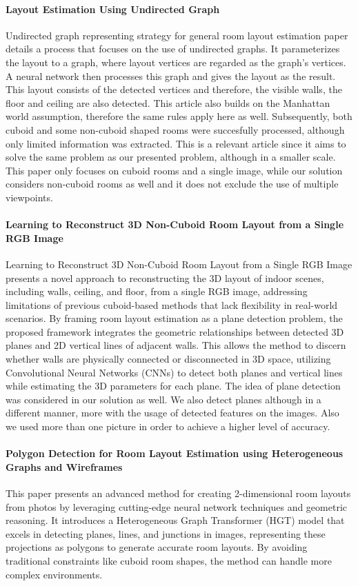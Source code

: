\paragraph{Layout Estimation Using Undirected Graph}
Undirected graph representing strategy for general room layout estimation\cite{YAO2023103963}
paper details a process that focuses on the use of undirected graphs. It parameterizes the layout to a graph, where layout vertices are regarded as the graph's vertices. A neural network then processes this graph and gives the layout as the result. This layout consists of the detected vertices and therefore, the visible walls, the floor and ceiling are also detected. This article also builds on the Manhattan world assumption\cite{790349}, therefore the same rules apply here as well. Subsequently, both cuboid and some non-cuboid shaped rooms were succesfully processed, although only limited information was extracted. This is a relevant article since it aims to solve the same problem as our presented problem, although in a smaller scale. This paper only focuses on cuboid rooms and a single image, while our solution considers non-cuboid rooms as well and it does not exclude the use of multiple viewpoints. 

\paragraph{Learning to Reconstruct 3D Non-Cuboid Room Layout from a Single RGB Image}
Learning to Reconstruct 3D Non-Cuboid Room Layout from a Single RGB Image\cite{9707088} presents a novel approach to reconstructing the 3D layout of indoor scenes, including walls, ceiling, and floor, from a single RGB image, addressing limitations of previous cuboid-based methods that lack flexibility in real-world scenarios. By framing room layout estimation as a plane detection problem, the proposed framework integrates the geometric relationships between detected 3D planes and 2D vertical lines of adjacent walls. This allows the method to discern whether walls are physically connected or disconnected in 3D space, utilizing Convolutional Neural Networks (CNNs) to detect both planes and vertical lines while estimating the 3D parameters for each plane. The idea of plane detection was considered in our solution as well. We also detect planes although in a different manner, more with the usage of detected features on the images. Also we used more than one picture in order to achieve a higher level of accuracy.

\paragraph{Polygon Detection for Room Layout Estimation using Heterogeneous Graphs and Wireframes}
This paper \cite{10350607} presents an advanced method for creating 2-dimensional room layouts from photos by leveraging cutting-edge neural network techniques and geometric reasoning. 
It introduces a Heterogeneous Graph Transformer (HGT) model that excels in detecting planes, lines, and junctions in images, representing these projections as polygons to generate accurate room layouts. 
By avoiding traditional constraints like cuboid room shapes, the method can handle more complex environments. 

